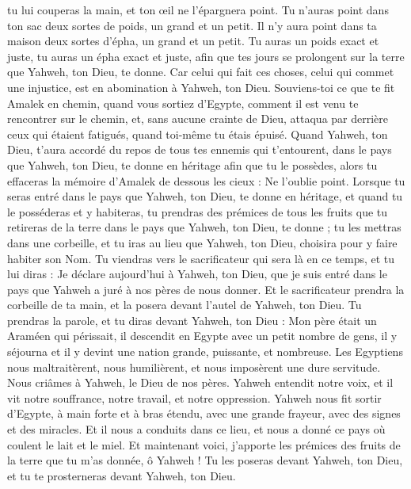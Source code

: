 \begin{multicols}{2}
tu lui couperas la main, et ton œil ne l'épargnera point.
Tu n'auras point dans ton sac deux sortes de poids, un grand et un petit.
Il n'y aura point dans ta maison deux sortes d'épha, un grand et un petit.
Tu auras un poids exact et juste, tu auras un épha exact et juste, afin que tes jours se prolongent sur la terre que Yahweh, ton Dieu, te donne.
Car celui qui fait ces choses, celui qui commet une injustice, est en abomination à Yahweh, ton Dieu.
Souviens-toi ce que te fit Amalek en chemin, quand vous sortiez d'Egypte,
comment il est venu te rencontrer sur le chemin, et, sans aucune crainte de Dieu, attaqua par derrière ceux qui étaient fatigués, quand toi-même tu étais épuisé.
Quand Yahweh, ton Dieu, t'aura accordé du repos de tous tes ennemis qui t’entourent, dans le pays que Yahweh, ton Dieu, te donne en héritage afin que tu le possèdes, alors tu effaceras la mémoire d'Amalek de dessous les cieux : Ne l'oublie point.
\VerseOne{}Lorsque tu seras entré dans le pays que Yahweh, ton Dieu, te donne en héritage, et quand tu le posséderas et y habiteras,
tu prendras des prémices de tous les fruits que tu retireras de la terre dans le pays que Yahweh, ton Dieu, te donne ; tu les mettras dans une corbeille, et tu iras au lieu que Yahweh, ton Dieu, choisira pour y faire habiter son Nom.
Tu viendras vers le sacrificateur qui sera là en ce temps, et tu lui diras : Je déclare aujourd'hui à Yahweh, ton Dieu, que je suis entré dans le pays que Yahweh a juré à nos pères de nous donner.
Et le sacrificateur prendra la corbeille de ta main, et la posera devant l'autel de Yahweh, ton Dieu.
Tu prendras la parole, et tu diras devant Yahweh, ton Dieu : Mon père était un Araméen qui périssait, il descendit en Egypte avec un petit nombre de gens, il y séjourna et il y devint une nation grande, puissante, et nombreuse.
Les Egyptiens nous maltraitèrent, nous humilièrent, et nous imposèrent une dure servitude.
Nous criâmes à Yahweh, le Dieu de nos pères. Yahweh entendit notre voix, et il vit notre souffrance, notre travail, et notre oppression.
Yahweh nous fit sortir d'Egypte, à main forte et à bras étendu, avec une grande frayeur, avec des signes et des miracles.
Et il nous a conduits dans ce lieu, et nous a donné ce pays où coulent le lait et le miel.
Et maintenant voici, j'apporte les prémices des fruits de la terre que tu m'as donnée, ô Yahweh ! Tu les poseras devant Yahweh, ton Dieu, et tu te prosterneras devant Yahweh, ton Dieu.

\end{multicols}
